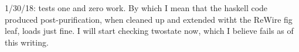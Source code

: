 1/30/18: tests one and zero work. By which I mean that the haskell code produced post-purification, when cleaned up and
extended witht the ReWire fig leaf, loads just fine. I will start checking twostate now, which I believe fails as of this
writing.
